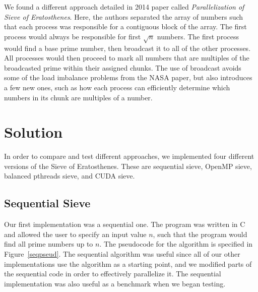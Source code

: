 \documentclass[11pt,twocolumn]{article}
\begin{document}
We found a different approach detailed in 2014 paper called
\textit{Parallelization of Sieve of Eratosthenes}\cite{Bhat}.
Here, the authors
separated the array of numbers such that each process was responsible
for a contiguous block of the array. The first process would always
be responsible for first $\sqrt{n}$ numbers. The first process would
find a base prime number, then broadcast it to all of the other
processes. All processes would then proceed to mark all numbers
that are multiples of the broadcasted prime within their assigned
chunks. The use of broadcast avoids some of the load imbalance 
problems from the NASA
paper, but also introduces a few new ones, such as how each process
can efficiently determine which numbers in its chunk are multiples of
a number.


\section {Solution}\label{soln}

In order to compare and test different approaches, we implemented four
different versions of the Sieve of Eratosthenes. These are sequential
sieve, OpenMP sieve, balanced pthreads sieve, and CUDA sieve.

\subsection{Sequential Sieve}\label{seqsection}

Our first implementation was a sequential one. The program was written in C
and allowed the user to specify an input value $n$, such that the program
would find all prime numbers up to $n$. The pseudocode for the algorithm
is specified in Figure~\ref{seqpseud}. The sequential algorithm 
was useful since all of our other implementations use the algorithm
as a starting point, and we modified parts of the sequential code in order to
effectively parallelize it. The sequential implementation was also useful as
a benchmark when we began testing.
\end{document}

